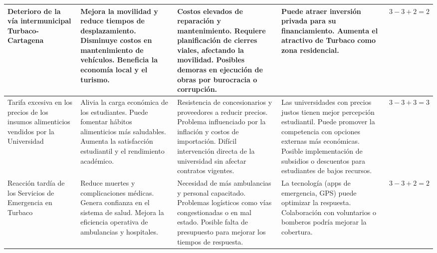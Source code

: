\documentclass[letterpaper, 11pt]{report}
\begin{document}
\begin{longtable}{|p{.2\linewidth}|p{.2\linewidth}|p{.2\linewidth}|p{.2\linewidth}|p{.1\linewidth}|}
      Deterioro de la vía intermunicipal Turbaco-Cartagena                         & Mejora la movilidad y
      reduce tiempos de desplazamiento. Disminuye costos en mantenimiento de
      vehículos. Beneficia la economía local y el turismo.                         & Costos elevados de
      reparación y mantenimiento. Requiere planificación de cierres viales, afectando
      la movilidad. Posibles demoras en ejecución de obras por burocracia o
      corrupción.                                                                  & Puede atraer inversión privada para su financiamiento. Aumenta el
      atractivo de Turbaco como zona residencial.                                  & $3 - 3 + 2 = 2$                                                                                                                      \\ \hline

      Tarifa excesiva en los precios de los insumos alimenticios vendidos por la
      Universidad                                                                  & Alivia la carga económica de los estudiantes. Puede fomentar
      hábitos alimenticios más saludables. Aumenta la satisfacción estudiantil y el
      rendimiento académico.                                                       & Resistencia de concesionarios y proveedores a reducir
      precios. Problema influenciado por la inflación y costos de importación.
      Difícil intervención directa de la universidad sin afectar contratos vigentes.
                                                                                   & Las universidades con precios justos tienen mejor percepción estudiantil.
      Puede promover la competencia con opciones externas más económicas. Posible
      implementación de subsidios o descuentos para estudiantes de bajos recursos. &
      $3 - 3 + 3 = 3$                                                                                                                                                                                                     \\ \hline

      Reacción tardía de los Servicios de Emergencia en Turbaco                    & Reduce muertes y
      complicaciones médicas. Genera confianza en el sistema de salud. Mejora la
      eficiencia operativa de ambulancias y hospitales.                            & Necesidad de más
      ambulancias y personal capacitado. Problemas logísticos como vías
      congestionadas o en mal estado. Posible falta de presupuesto para mejorar los
      tiempos de respuesta.                                                        & La tecnología (apps de emergencia, GPS) puede optimizar
      la respuesta. Colaboración con voluntarios o bomberos podría mejorar la
      cobertura.                                                                   & $3 - 3 + 2 = 2$                                                                                                                      \\
\end{longtable}
\end{document}
